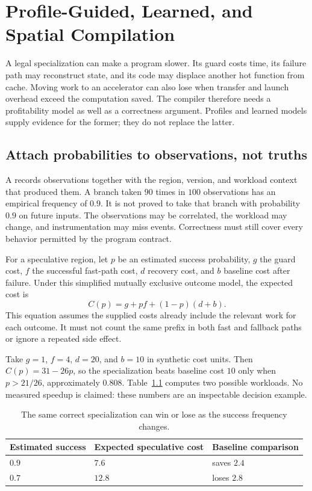 \chapter{Profile-Guided, Learned, and Spatial Compilation}
\label{ch:profile-spatial-compilation}

A legal specialization can make a program slower.
Its guard costs time, its failure path may reconstruct state, and its code may displace another hot function from cache.
Moving work to an accelerator can also lose when transfer and launch overhead exceed the computation saved.
The compiler therefore needs a profitability model as well as a correctness argument.
Profiles and learned models supply evidence for the former; they do not replace the latter.

\section{Attach probabilities to observations, not truths}
\label{sec:ch68-probabilities}

A  records observations together with the region, version, and workload context that produced them.
A branch taken $90$ times in $100$ observations has an empirical frequency of $0.9$.
It is not proved to take that branch with probability $0.9$ on future inputs.
The observations may be correlated, the workload may change, and instrumentation may miss events.
Correctness must still cover every behavior permitted by the program contract.

For a speculative region, let $p$ be an estimated success probability, $g$ the guard cost, $f$ the successful fast-path cost, $d$ recovery cost, and $b$ baseline cost after failure.
Under this simplified mutually exclusive outcome model, the expected cost is
\[
C(p)=g+pf+(1-p)(d+b).
\]
This equation assumes the supplied costs already include the relevant work for each outcome.
It must not count the same prefix in both fast and fallback paths or ignore a repeated side effect.

Take $g=1$, $f=4$, $d=20$, and $b=10$ in synthetic cost units.
Then $C(p)=31-26p$, so the specialization beats baseline cost $10$ only when $p>21/26$, approximately $0.808$.
Table~\ref{tab:ch68-risk} computes two possible workloads.
No measured speedup is claimed: these numbers are an inspectable decision example.

\begin{table}[htbp]
\caption{The same correct specialization can win or lose as the success frequency changes.}
\label{tab:ch68-risk}
\centering
\begin{tabular}{lll}
\toprule
Estimated success & Expected speculative cost & Baseline comparison \\
\midrule
$0.9$ & $7.6$ & saves $2.4$ \\
$0.7$ & $12.8$ & loses $2.8$ \\
\bottomrule
\end{tabular}
\end{table}

